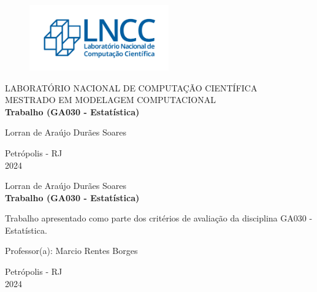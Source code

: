 \documentclass[a4paper, 11pt]{article}
\begin{document}
\begin{titlepage}
	\begin{center}
	\begin{figure}[!ht]
	\centering
	\includegraphics[width=6cm]{imgs/LNCC.png}
	\end{figure}
		LABORATÓRIO NACIONAL DE COMPUTAÇÃO CIENTÍFICA\\
		MESTRADO EM MODELAGEM COMPUTACIONAL\\ 
		\vspace{7cm}
		{\Large \textbf{Trabalho (GA030 - Estatística)}}
		\vspace{3cm}
	\end{center}
	
	\begin{flushright}
            Lorran de Araújo Durães Soares\\
	 \end{flushright}

	\begin{center}
		\vspace{\fill}
		 Petrópolis - RJ\\
         2024
	\end{center}
\end{titlepage}

\begin{titlepage}
	\begin{center}
        Lorran de Araújo Durães Soares \\
      \vspace{7cm}
      {\Large \textbf{Trabalho (GA030 - Estatística)}}
	\end{center}
\vspace{3cm}
	\begin{flushright}
   \begin{list}{}{
      \setlength{\leftmargin}{5cm}
      \setlength{\rightmargin}{0cm}
      \setlength{\labelwidth}{0pt}
      \setlength{\labelsep}{\leftmargin}}
      \begin{flushright}
          \item Trabalho  apresentado  como  parte  dos  critérios 
de avaliação da disciplina GA030 - Estatística.
       \item Professor(a): Marcio Rentes Borges
      \end{flushright}
      
   \end{list}
	\end{flushright}

	\begin{center}
		\vspace{\fill}
		 Petrópolis - RJ\\
         2024
	\end{center}
\end{titlepage}
\end{document}
